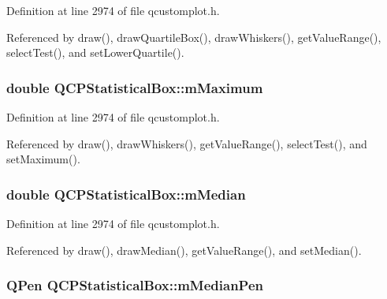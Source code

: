 Definition at line 2974 of file qcustomplot.\+h.



Referenced by draw(), draw\+Quartile\+Box(), draw\+Whiskers(), get\+Value\+Range(), select\+Test(), and set\+Lower\+Quartile().

\hypertarget{class_q_c_p_statistical_box_a16266f1e0e4e8e95b5d141c49479ef2e}{}
\subsubsection[{m\+Maximum}]{\setlength{\rightskip}{0pt plus 5cm}double Q\+C\+P\+Statistical\+Box\+::m\+Maximum\hspace{0.3cm}{\ttfamily [protected]}}\label{class_q_c_p_statistical_box_a16266f1e0e4e8e95b5d141c49479ef2e}


Definition at line 2974 of file qcustomplot.\+h.



Referenced by draw(), draw\+Whiskers(), get\+Value\+Range(), select\+Test(), and set\+Maximum().

\hypertarget{class_q_c_p_statistical_box_ae43287ca13c8166bde2ac19bf0969d23}{}
\subsubsection[{m\+Median}]{\setlength{\rightskip}{0pt plus 5cm}double Q\+C\+P\+Statistical\+Box\+::m\+Median\hspace{0.3cm}{\ttfamily [protected]}}\label{class_q_c_p_statistical_box_ae43287ca13c8166bde2ac19bf0969d23}


Definition at line 2974 of file qcustomplot.\+h.



Referenced by draw(), draw\+Median(), get\+Value\+Range(), and set\+Median().

\hypertarget{class_q_c_p_statistical_box_a1af5b601049c575f778ae270f40c9443}{}
\subsubsection[{m\+Median\+Pen}]{\setlength{\rightskip}{0pt plus 5cm}Q\+Pen Q\+C\+P\+Statistical\+Box\+::m\+Median\+Pen\hspace{0.3cm}{\ttfamily [protected]}}\label{class_q_c_p_statistical_box_a1af5b601049c575f778ae270f40c9443}


